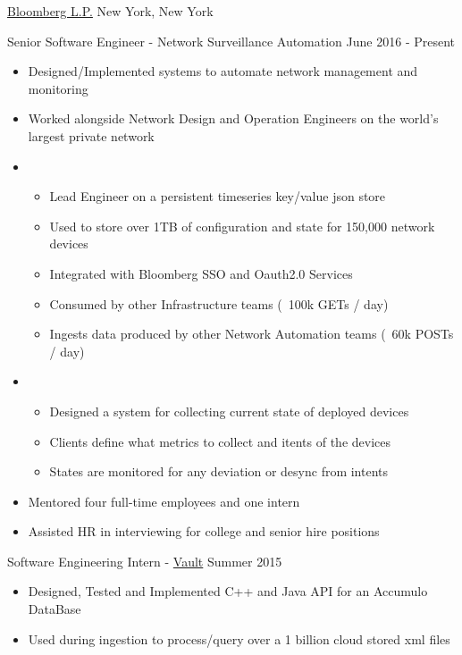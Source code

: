 \documentclass[11pt]{article}
\begin{document}
\headedsection  %
{\href{http://www.bloomberg.com/company}{Bloomberg L.P.}}
{New York, New York}
{
    \headedsubsection
    {Senior Software Engineer - Network Surveillance Automation}
    {June 2016 - Present}
    {
        \begin{itemize}
            \item Designed/Implemented systems to automate network management and monitoring
            \item Worked alongside Network Design and Operation Engineers on the world's largest private network
            \item{}
            { \begin{itemize}
                \item Lead Engineer on a persistent timeseries key/value json store
                \item Used to store over 1TB of configuration and state for 150,000 network devices
                \item Integrated with Bloomberg SSO and Oauth2.0 Services
                \item Consumed by other Infrastructure teams (~100k GETs / day)
                \item Ingests data produced by other Network Automation teams (~60k POSTs / day)
                \end{itemize} }
            \item{}
            { \begin{itemize}
                \item Designed a system for collecting current state of deployed devices
                \item Clients define what metrics to collect and itents of the devices
                \item States are monitored for any deviation or desync from intents
                \end{itemize} }
            \item Mentored four full-time employees and one intern
            \item Assisted HR in interviewing for college and senior hire positions
        \end{itemize}

    }
}
\headedsection  %
{}
{}
{
    \headedsubsection
    {Software Engineering Intern - \href{https://www.bloomberg.com/professional/product/vault/}{Vault}}
    {Summer 2015}
    {
        \begin{itemize}
            \item Designed, Tested and Implemented C++ and Java API for an Accumulo DataBase
            \item Used during ingestion to process/query over a 1 billion cloud stored xml files
        \end{itemize}
    }
}
\end{document}
